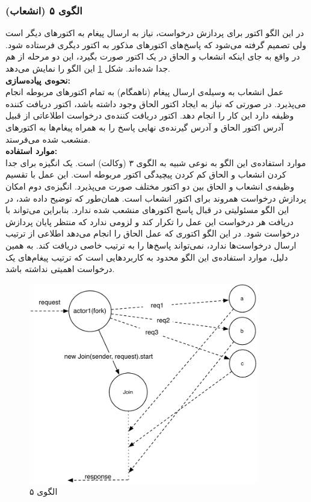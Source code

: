 \subsubsection{الگوی ۵ (انشعاب)}
در این الگو اکتور برای پردازش درخواست، نیاز به ارسال پیغام به اکتورهای دیگر است ولی تصمیم گرفته می‌شود که پاسخ‌های اکتورهای مذکور به اکتور دیگری فرستاده شود. در واقع به جای اینکه انشعاب و الحاق در یک اکتور صورت بگیرد، این دو مرحله از هم جدا شده‌اند. شکل \ref{fig:Patterns_stateless_fj} این الگو را نمایش می‌دهد.\\
\textbf{نحوه‌ی پیاده‌سازی:}\\
عمل انشعاب به وسیله‌ی ارسال پیغام (ناهمگام) به تمام اکتورهای مربوطه انجام می‌پذیرد. در صورتی که نیاز به ایجاد اکتور الحاق وجود داشته باشد، اکتور دریافت کننده وظیفه دارد این کار را انجام دهد. اکتور دریافت کننده‌ی درخواست اطلاعاتی از قبیل آدرس اکتور الحاق و آدرس گیرنده‌ی نهایی پاسخ را به همراه پیغام‌ها به اکتورهای منشعب شده می‌فرستد.\\
\textbf{موارد استفاده:}\\
موارد استفاده‌ی این الگو به نوعی شبیه به الگوی ۳ (وکالت) است. یک انگیزه برای جدا کردن انشعاب و الحاق کم کردن پیچیدگی اکتور مربوطه است. این عمل با تقسیم وظیفه‌ی انشعاب و الحاق بین دو اکتور مختلف صورت می‌پذیرد. انگیزه‌ی دوم امکان پردازش درخواست همروند برای اکتور انشعاب است. همان‌طور که توضیح داده شد، در این الگو مسئولیتی در قبال پاسخ اکتورهای منشعب شده ندارد. بنابراین می‌تواند با دریافت هر درخواست این عمل را تکرار کند و لزومی ندارد که منتظر پایان پردازش درخواست شود. در این الگو اکتوری که عمل الحاق را انجام می‌دهد اطلاعی از ترتیب ارسال درخواست‌ها ندارد، نمی‌تواند پاسخ‌ها را به ترتیب خاصی دریافت کند. به همین دلیل، موارد استفاده‌ی این الگو محدود به کاربردهایی است که ترتیب پیغام‌های یک درخواست اهمیتی نداشته باشد.
\begin{figure}[hb]
    \begin{center}
	\includegraphics[width=10cm]{4-ProposedFramework/Figures/Patterns_stateless_fj.pdf}
    \end{center}
    \caption{\label{fig:Patterns_stateless_fj}الگوی ۵}
\end{figure}

